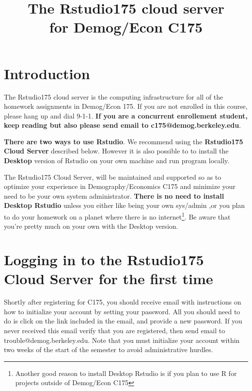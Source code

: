 \documentclass[11pt]{article}
\begin{document}
\title{The Rstudio175 cloud server\\
for Demog/Econ C175}

\maketitle
\tableofcontents

\section{Introduction}

The Rstudio175 cloud server is the computing infrastructure for all of the homework assignments in Demog/Econ 175. If you are not enrolled in this course, please hang up and dial 9-1-1.  \textbf{If you are a concurrent enrollement student, keep reading but also please send email to c175@demog.berkeley.edu}.

\begin{mdframed}[backgroundcolor=blue!20]        
\textbf{There are two ways to use Rstudio}. We recommend using the \textbf{Rstudio175 Cloud Server} described below. However it is also possible to  to install the \textbf{Desktop} version of  Rstudio on your own machine and run program locally.

The Rstudio175 Cloud Server, will be maintained and supported so as to optimize your experience in Demography/Economics C175 and minimize your need to be your own system administrator.  \textbf{There is no need to install Desktop Rstudio} unless you either like  being your own sys/admin ,or you plan to do your homework on a planet where there is no internet\footnote{Another good reason to install Desktop Rstudio is if you plan to use R for projects outside of Demog/Econ C175}. Be aware that you're pretty much on your own with the Desktop version.  
\end{mdframed}
\section{Logging in to the Rstudio175 Cloud Server for the first time}

Shortly after registering for C175, you should receive email with instructions on how to initialize your account by setting your password.  All you should need to do is click on the link included in the email, and provide a new password.  If you never received this email verify that you are registered, then send email to trouble@demog.berkeley.edu.  Note that you must initialize your account within two weeks of the start of the semester to avoid administrative hurdles.
\end{document}
